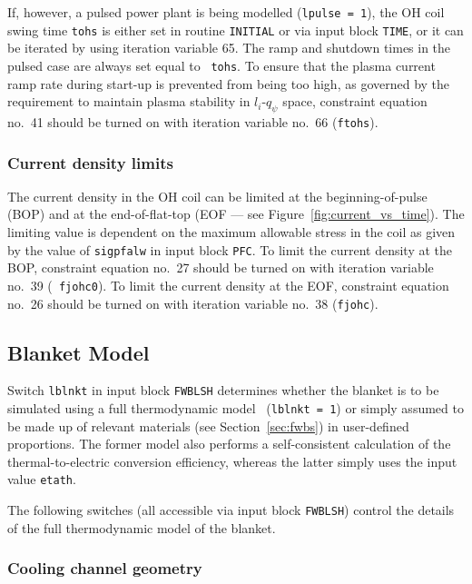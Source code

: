 \documentclass[11pt,a4paper]{report}
\begin{document}
If, however, a pulsed power plant is being modelled ({\tt lpulse = 1}), the OH
coil swing time {\tt tohs} is either set in routine {\tt INITIAL} or via input
block {\tt TIME}, or it can be iterated by using iteration variable 65. The
ramp and shutdown times in the pulsed case are always set equal to {\tt
tohs}. To ensure that the plasma current ramp rate during start-up is
prevented from being too high, as governed by the requirement to maintain
plasma stability in $l_i$-$q_\psi$ space, constraint equation no.\ 41 should
be turned on with iteration variable no.\ 66 ({\tt ftohs}).
\setlength{\parskip}{0mm}

\subsubsection{Current density limits}

The current density in the OH coil can be limited at the beginning-of-pulse
(BOP) and at the end-of-flat-top (EOF --- see
Figure~\ref{fig:current_vs_time}). The limiting value is dependent on the
maximum allowable stress in the coil as given by the value of {\tt sigpfalw}
in input block {\tt PFC}. To limit the current density at the BOP, constraint
equation no.\ 27 should be turned on with iteration variable no.\ 39 ({\tt
fjohc0}). To limit the current density at the EOF, constraint equation no.\ 26
should be turned on with iteration variable no.\ 38 ({\tt fjohc}).

\subsection{Blanket Model}

Switch {\tt lblnkt} in input block {\tt FWBLSH} determines whether the blanket
is to be simulated using a full thermodynamic model~\cite{Panos} ({\tt lblnkt
= 1}) or simply assumed to be made up of relevant materials (see
Section~\ref{sec:fwbs}) in user-defined proportions. The former model also
performs a self-consistent calculation of the thermal-to-electric conversion
efficiency, whereas the latter simply uses the input value {\tt etath}.
\setlength{\parskip}{5mm}

The following switches (all accessible via input block {\tt FWBLSH}) control
the details of the full thermodynamic model of the blanket.
\setlength{\parskip}{0mm}

\subsubsection{Cooling channel geometry}
\end{document}
